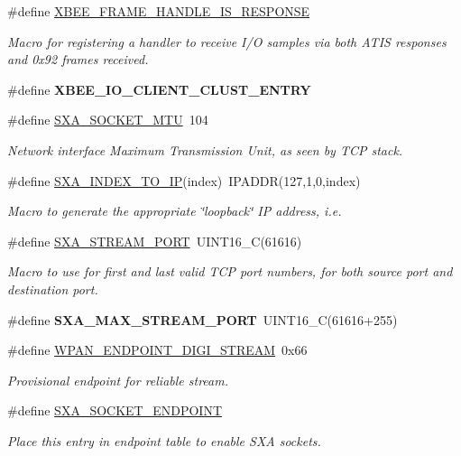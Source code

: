\begin{DoxyCompactItemize}
\#define \hyperlink{group___s_x_a_ga4ef8415bf147396546ed97d7fc7ef8fd}{X\+B\+E\+E\+\_\+\+F\+R\+A\+M\+E\+\_\+\+H\+A\+N\+D\+L\+E\+\_\+\+I\+S\+\_\+\+R\+E\+S\+P\+O\+N\+SE}
\begin{DoxyCompactList}\small\item\em Macro for registering a handler to receive I/O samples via both A\+T\+IS responses and 0x92 frames received. \end{DoxyCompactList}\item 
\#define {\bfseries X\+B\+E\+E\+\_\+\+I\+O\+\_\+\+C\+L\+I\+E\+N\+T\+\_\+\+C\+L\+U\+S\+T\+\_\+\+E\+N\+T\+RY}
\item 
\#define \hyperlink{group___s_x_a_ga24cd1c18c4568b532a09c4d3ae6a3700}{S\+X\+A\+\_\+\+S\+O\+C\+K\+E\+T\+\_\+\+M\+TU}~104
\begin{DoxyCompactList}\small\item\em Network interface Maximum Transmission Unit, as seen by T\+CP stack. \end{DoxyCompactList}\item 
\#define \hyperlink{group___s_x_a_ga0ae330bea7b42c331e9f473387e5766b}{S\+X\+A\+\_\+\+I\+N\+D\+E\+X\+\_\+\+T\+O\+\_\+\+IP}(index)~I\+P\+A\+D\+DR(127,1,0,index)
\begin{DoxyCompactList}\small\item\em Macro to generate the appropriate \char`\"{}loopback\char`\"{} IP address, i.\+e. \end{DoxyCompactList}\item 
\#define \hyperlink{group___s_x_a_ga686d56084362bb9152a4d5e6b048b80d}{S\+X\+A\+\_\+\+S\+T\+R\+E\+A\+M\+\_\+\+P\+O\+RT}~U\+I\+N\+T16\+\_\+C(61616)
\begin{DoxyCompactList}\small\item\em Macro to use for first and last valid T\+CP port numbers, for both source port and destination port. \end{DoxyCompactList}\item 
\mbox{\label{group___s_x_a_gab048ec29a4d3a7904f5aec7986ddcf6e}} 
\#define {\bfseries S\+X\+A\+\_\+\+M\+A\+X\+\_\+\+S\+T\+R\+E\+A\+M\+\_\+\+P\+O\+RT}~U\+I\+N\+T16\+\_\+C(61616+255)
\item 
\mbox{\label{group___s_x_a_ga1d3ed304c9ba526771772782f6f446e5}} 
\#define \hyperlink{group___s_x_a_ga1d3ed304c9ba526771772782f6f446e5}{W\+P\+A\+N\+\_\+\+E\+N\+D\+P\+O\+I\+N\+T\+\_\+\+D\+I\+G\+I\+\_\+\+S\+T\+R\+E\+AM}~0x66
\begin{DoxyCompactList}\small\item\em Provisional endpoint for reliable stream. \end{DoxyCompactList}\item 
\#define \hyperlink{group___s_x_a_gacef6e474f41d87ead3269f543f2c5efd}{S\+X\+A\+\_\+\+S\+O\+C\+K\+E\+T\+\_\+\+E\+N\+D\+P\+O\+I\+NT}
\begin{DoxyCompactList}\small\item\em Place this entry in endpoint table to enable S\+XA sockets. \end{DoxyCompactList}\end{DoxyCompactItemize}
